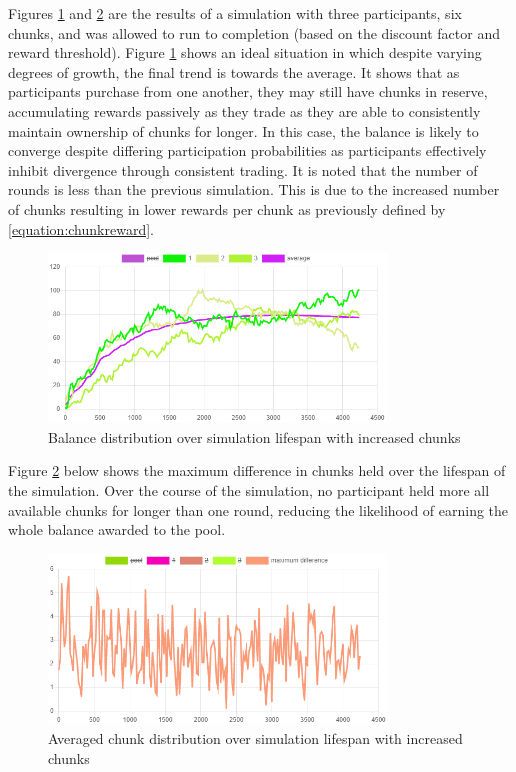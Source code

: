 Figures \ref{figure:simulation-converge-balance} and \ref{figure:simulation-converge-chunks} are the results of a simulation with three participants, six chunks, and was allowed to run to completion (based on the discount factor and reward threshold). Figure \ref{figure:simulation-converge-balance} shows an ideal situation in which despite varying degrees of growth, the final trend is towards the average. It shows that as participants purchase from one another, they may still have chunks in reserve, accumulating rewards passively as they trade as they are able to consistently maintain ownership of chunks for longer. In this case, the balance is likely to converge despite differing participation probabilities as participants effectively inhibit divergence through consistent trading. It is noted that the number of rounds is less than the previous simulation. This is due to the increased number of chunks resulting in lower rewards per chunk as previously defined by \cref{equation:chunkreward}.

\begin{figure}[H]
  \centering
  \caption{Balance distribution over simulation lifespan with increased chunks}
  \label{figure:simulation-converge-balance}
  \includegraphics[width=0.8\textwidth]{media/simulation-converge-balance.PNG}
\end{figure}

Figure \ref{figure:simulation-converge-chunks} below shows the maximum difference in chunks held over the lifespan of the simulation. Over the course of the simulation, no participant held more all available chunks for longer than one round, reducing the likelihood of earning the whole balance awarded to the pool.

\begin{figure}[H]
  \centering
  \caption{Averaged chunk distribution over simulation lifespan with increased chunks}
  \label{figure:simulation-converge-chunks}
  \includegraphics[width=0.8\textwidth]{media/simulation-converge-chunks.PNG}
\end{figure}

